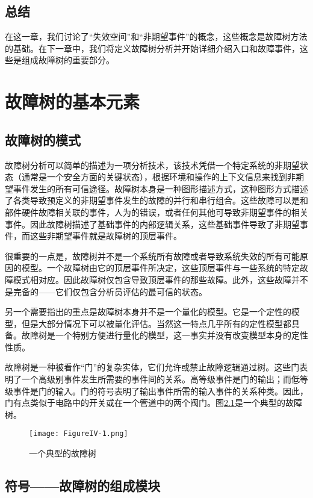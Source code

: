 \documentclass[cn,11pt,chinese]{elegantbook}
\begin{document}
\section{总结}

在这一章，我们讨论了“失效空间”和“非期望事件”的概念，这些概念是故障树方法的基础。在下一章中，我们将定义故障树分析并开始详细介绍入口和故障事件，这些是组成故障树的重要部分。

\chapter{故障树的基本元素}

\section{故障树的模式}

故障树分析可以简单的描述为一项分析技术，该技术凭借一个特定系统的非期望状态（通常是一个安全方面的关键状态），根据环境和操作的上下文信息来找到非期望事件发生的所有可信途径。故障树本身是一种图形描述方式，这种图形方式描述了各类导致预定义的非期望事件发生的故障的并行和串行组合。这些故障可以是和部件硬件故障相关联的事件，人为的错误，或者任何其他可导致非期望事件的相关事件。因此故障树描述了基础事件的内部逻辑关系，这些基础事件导致了非期望事件，而这些非期望事件就是故障树的顶层事件。

很重要的一点是，故障树并不是一个系统所有故障或者导致系统失效的所有可能原因的模型。一个故障树由它的顶层事件所决定，这些顶层事件与一些系统的特定故障模式相对应。因此故障树仅包含导致顶层事件的那些故障。此外，这些故障并不是完备的——它们仅包含分析员评估的最可信的状态。

另一个需要指出的重点是故障树本身并不是一个量化的模型。它是一个定性的模型，但是大部分情况下可以被量化评估。当然这一特点几乎所有的定性模型都具备。故障树是一个特别方便进行量化的模型，这一事实并没有改变模型本身的定性性质。

故障树是一种被看作“门”的复杂实体，它们允许或禁止故障逻辑通过树。这些门表明了一个高级别事件发生所需要的事件间的关系。高等级事件是门的输出；而低等级事件是门的输入。门的符号表明了输出事件所需的输入事件的关系种类。因此，门有点类似于电路中的开关或在一个管道中的两个阀门。图\ref{fig:fig4_1}是一个典型的故障树。

\begin{figure}[h]
	\centering
	\texttt{[image: FigureIV-1.png]}
	\caption{一个典型的故障树}\label{fig:fig4_1}
\end{figure}

\section{符号——故障树的组成模块}
\end{document}
